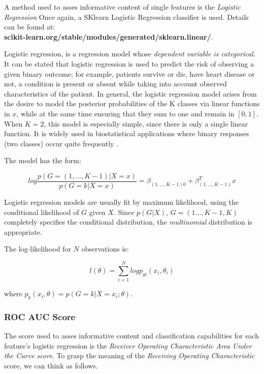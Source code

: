 \documentclass[12pt,openright,twoside,a4paper]{book}
\begin{document}
A method used to asses informative content of single features is the \textit{Logistic Regression}
Once again, a SKlearn Logistic Regression classifier is used. 
Details can be found at: \\ \textbf{scikit-learn.org/stable/modules/generated/sklearn.linear/}.

Logistic regression,  is a regression model whose \textit{dependent variable is categorical}.
It can be stated that logistic regression is used to predict the risk of observing a given binary outcome; for example, patients survive or die, have heart disease or not, a condition is present or absent while taking into account observed characteristics of the patient.
In general, the logistic regression model arises from the desire to model the posterior probabilities of the K classes via linear functions in $x$, while at the same time ensuring that they sum to one and remain in $[0,1]$.
When $K = 2$, this model is especially simple, since there is only a single linear function. It is widely used in biostatistical applications where binary responses (two classes) occur quite frequently \cite{ESL}.

The model has the form:

\begin{equation}
log\frac{p(G=(1,...,K-1)|X=x)}{p(G=k|X=x)}=\beta_{(1,...,K-1)0}+\beta^T_{(1,...,K-1)}x
\end{equation}

Logistic regression models are usually fit by maximum likelihood, using the conditional likelihood of $G$ given $X$. Since $p(G|X)$, $G=(1...,K-1,K)$ completely specifies the conditional distribution, the \textit{multinomial} distribution is appropriate. 

The log-likelihood for $N$ observations is:

\begin{equation}
l(\theta)=\sum_{i=1}^N log p_{gi}(x_i,\theta_i)
\end{equation}

where $p_k(x_i,\theta)=p(G = k|X = x_i; \theta)$.

\subsubsection{ROC AUC Score}

The score used to asses informative content and classification capabilities for each feature's logistic regression is the \textit{Receiver Operating Characteristic Area Under the Curve score}.
To grasp the meaning of the \textit{Receiving Operating Characteristic} score, we can think as follows. 
\end{document}
